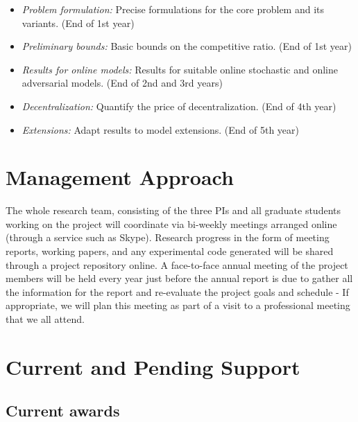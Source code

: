 \begin{itemize}
\item
{\sl Problem formulation:} Precise formulations for the core problem
and its variants.  (End of 1st year)
\item
{\sl Preliminary bounds:} Basic bounds on the competitive ratio. (End of 1st year)
\item
{\sl Results for online models:} Results for suitable online stochastic and
online adversarial models. (End of 2nd and 3rd years)
\item
{\sl Decentralization:} Quantify the price of decentralization. (End of 4th year)
\item
{\sl Extensions:} Adapt results to model extensions. (End of 5th year)
\end{itemize}

\section{Management Approach}

The whole research team, consisting of the three PIs and all graduate students working on the project will coordinate via bi-weekly meetings arranged online (through a service such as Skype). Research progress in the form of meeting reports, working papers, and any experimental code generated will be shared through a project repository online. A face-to-face annual meeting of the project members will be held every year just before the annual report is due to gather all the information for the report and re-evaluate the project goals and schedule - If appropriate, we will plan this meeting as part of a visit to a professional meeting that we all attend.


\section{Current and Pending Support}

\subsection{Current awards}

